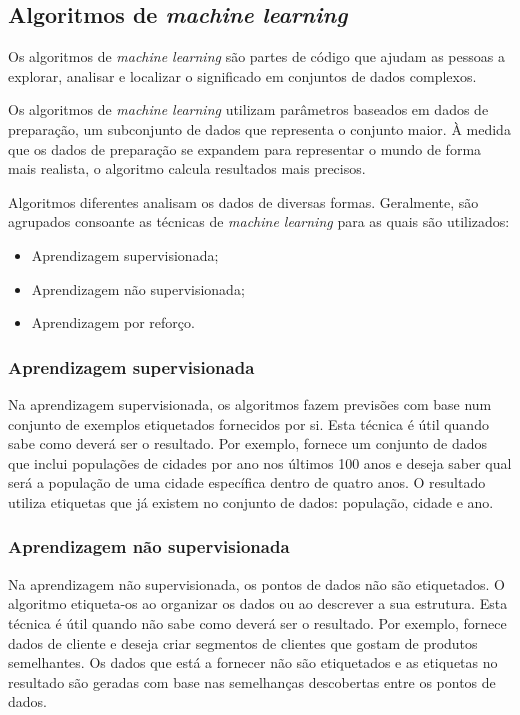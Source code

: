 \subsection{Algoritmos de \textit{machine learning}}

Os algoritmos de \textit{machine learning} são partes de código que ajudam as pessoas a explorar, analisar e localizar o significado em conjuntos de dados complexos.

Os algoritmos de \textit{machine learning} utilizam parâmetros baseados em dados de preparação, um subconjunto de dados que representa o conjunto maior.
À medida que os dados de preparação se expandem para representar o mundo de forma mais realista, o algoritmo calcula resultados mais precisos.

Algoritmos diferentes analisam os dados de diversas formas.
Geralmente, são agrupados consoante as técnicas de \textit{machine learning} para as quais são utilizados:
\begin{itemize}
  \setlength\itemsep{0.05em}
  \item Aprendizagem supervisionada;
  \item Aprendizagem não supervisionada;
  \item Aprendizagem por reforço.
\end{itemize}

\subsubsection{Aprendizagem supervisionada}

Na aprendizagem supervisionada, os algoritmos fazem previsões com base num conjunto de exemplos etiquetados fornecidos por si.
Esta técnica é útil quando sabe como deverá ser o resultado.
Por exemplo, fornece um conjunto de dados que inclui populações de cidades por ano nos últimos 100 anos e deseja saber qual será a população de uma cidade específica dentro de quatro anos.
O resultado utiliza etiquetas que já existem no conjunto de dados: população, cidade e ano.

\subsubsection{Aprendizagem não supervisionada}

Na aprendizagem não supervisionada, os pontos de dados não são etiquetados.
O algoritmo etiqueta-os ao organizar os dados ou ao descrever a sua estrutura.
Esta técnica é útil quando não sabe como deverá ser o resultado.
Por exemplo, fornece dados de cliente e deseja criar segmentos de clientes que gostam de produtos semelhantes.
Os dados que está a fornecer não são etiquetados e as etiquetas no resultado são geradas com base nas semelhanças descobertas entre os pontos de dados.


